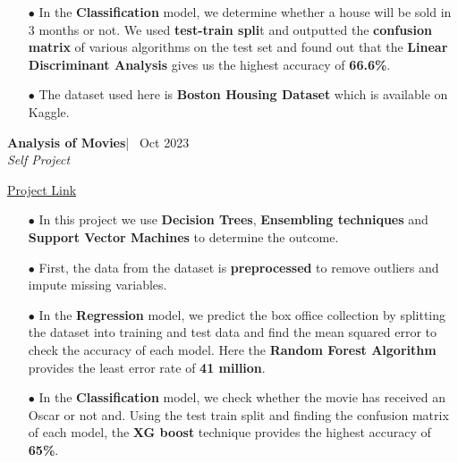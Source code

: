 \documentclass[10.7pt]{article}  %
\begin{document}
{{{\begin{itemize}[itemsep = -0.75 mm]
        \item[{\color[RGB]{10,0,254}$\bullet$}] \noindent In the \textbf{Classification} model, we determine whether a house will be sold in 3 months or not. We used \textbf{test-train spli}t and outputted the \textbf{confusion matrix }of various algorithms on the test set and found out that the \textbf{Linear Discriminant Analysis} gives us the highest accuracy of \textbf{66.6\%}.
        \item[{\color[RGB]{10,0,254}$\bullet$}] \noindent The dataset used here is \textbf{Boston Housing Dataset} which is available on Kaggle.
	\end{itemize} 
 \textbf{\large{Analysis of Movies}}|  \hfill {\ \small Oct 2023}
\\[0.05cm]
\emph{Self Project} \hfill {\href{https://github.com/Sharath1036/movie-analysis}{\underline{Project Link} }
\\[-0.6cm]	
	\begin{itemize}[itemsep = -0.75 mm]
        \item[{\color[RGB]{10,0,254}$\bullet$}] \noindent In this project we use \textbf{Decision Trees}, \textbf{Ensembling techniques} and \textbf{Support Vector Machines} to determine the outcome.
        \item[{\color[RGB]{10,0,254}$\bullet$}] \noindent First, the data from the dataset is \textbf{preprocessed }to remove outliers and impute missing variables.
        \item[{\color[RGB]{10,0,254}$\bullet$}] \noindent In the \textbf{Regression} model, we predict the box office collection by splitting the dataset into training and test data and find the mean squared error to check the accuracy of each model. Here the \textbf{Random Forest Algorithm} provides the least error rate of \textbf{41 million}.
        \item[{\color[RGB]{10,0,254}$\bullet$}] \noindent In the \textbf{Classification} model, we check whether the movie has received an Oscar or not and. Using the test train split and finding the confusion matrix of each model, the \textbf{XG boost} technique provides the highest accuracy of \textbf{65\%}.
        
	\end{itemize} 
\vspace{-15pt}

}}}}
\end{document}
